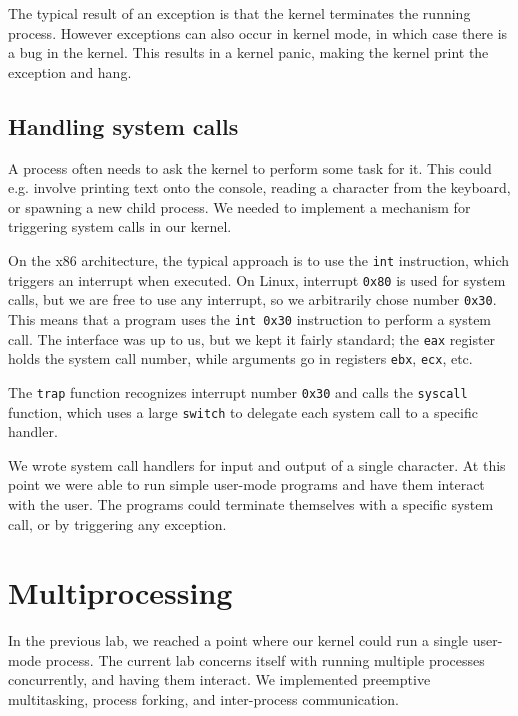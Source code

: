 \documentclass{article}
\begin{document}
The typical result of an exception is that the kernel terminates the running
process. However exceptions can also occur in kernel mode, in which case there
is a bug in the kernel. This results in a kernel panic, making the kernel
print the exception and hang.



\subsection{Handling system calls}
A process often needs to ask the kernel to perform some task for it. This
could e.g. involve printing text onto the console, reading a character from
the keyboard, or spawning a new child process. We needed to implement a
mechanism for triggering system calls in our kernel.

On the x86 architecture, the typical approach is to use the \texttt{int}
instruction, which triggers an interrupt when executed. On Linux, interrupt
\texttt{0x80} is used for system calls, but we are free to use any interrupt, so we
arbitrarily chose number \texttt{0x30}. This means that a program uses the \texttt{int
0x30} instruction to perform a system call. The interface was up to us, but we
kept it fairly standard; the \texttt{eax} register holds the system call
number, while arguments go in registers \texttt{ebx}, \texttt{ecx}, etc.

The \texttt{trap} function recognizes interrupt number \texttt{0x30} and calls the
\texttt{syscall} function, which uses a large \texttt{switch} to delegate each
system call to a specific handler.

We wrote system call handlers for input and output of a single character. At
this point we were able to run simple user-mode programs and have them
interact with the user. The programs could terminate themselves with a
specific system call, or by triggering any exception.




\section{Multiprocessing}
In the previous lab, we reached a point where our kernel could run a single
user-mode process. The current lab concerns itself with running multiple
processes concurrently, and having them interact. We implemented preemptive
multitasking, process forking, and inter-process communication. 
\end{document}
